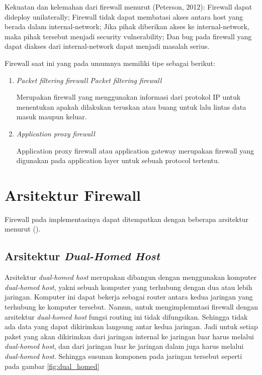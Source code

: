 Kekuatan dan kelemahan dari firewall menurut (Peterson, 2012):
Firewall dapat dideploy unilaterally;
Firewall tidak dapat membatasi akses antara host yang berada dalam internal-network;
Jika pihak diberikan akses ke internal-network, maka pihak tersebut menjadi security vulnerability;
Dan bug pada firewall yang dapat diakses dari internal-network dapat menjadi masalah serius.

Firewall saat ini yang pada umumnya memiliki tipe sebagai berikut:

\begin{enumerate}
	\item \textit{Packet filtering firewall}
	\textit{Packet filtering firewall}
	
	Merupakan firewall yang menggunakan informasi dari protokol IP untuk menentukan apakah dilakukan teruskan atau buang untuk lalu lintas data masuk maupun keluar.
	
	\item \textit{Application proxy firewall}
	
	Application proxy firewall atau application gateway merupakan firewall yang digunakan pada application layer untuk sebuah protocol tertentu.
\end{enumerate}

\section{Arsitektur Firewall}
Firewall pada implementasinya dapat ditempatkan dengan beberapa arsitektur menurut (\cite{zwicky2000building}).

\subsection{Arsitektur \textit{Dual-Homed Host}}

Arsitektur \textit{dual-homed host} merupakan dibangun dengan menggunakan komputer \textit{dual-homed host}, yakni sebuah komputer yang terhubung dengan dua atau lebih jaringan. Komputer ini dapat bekerja sebagai router antara kedua jaringan yang terhubung ke komputer tersebut. Namun, untuk mengimplemntasi firewall dengan arsitektur \textit{dual-homed host} fungsi routing ini tidak difungsikan. Sehingga tidak ada data yang dapat dikirimkan langsung antar kedua jaringan. Jadi untuk setiap paket yang akan dikirimkan dari jaringan internal ke jaringan luar harus melalui \textit{dual-homed host}, dan dari jaringan luar ke jaringan dalam juga harus melalui \textit{dual-homed host}. Sehingga susunan komponen pada jaringan tersebut seperti pada gambar \ref{fig:dual_homed}

